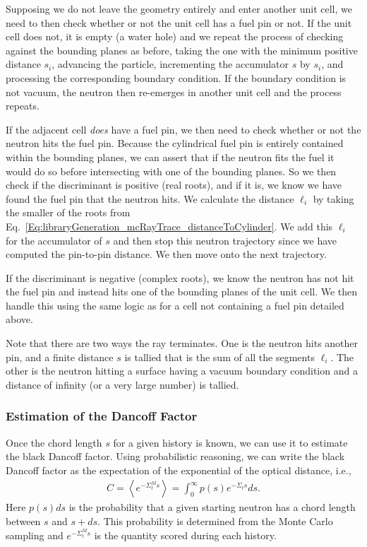 Supposing we do not leave the geometry entirely and enter another unit cell, we need to then check whether or not the unit cell has a fuel pin or not. If the unit cell does not, it is empty (a water hole) and we repeat the process of checking against the bounding planes as before, taking the one with the minimum positive distance $s_i$, advancing the particle, incrementing the accumulator $s$ by $s_i$, and processing the corresponding boundary condition. If the boundary condition is not vacuum, the neutron then re-emerges in another unit cell and the process repeats.

If the adjacent cell \emph{does} have a fuel pin, we then need to check whether or not the neutron hits the fuel pin. Because the cylindrical fuel pin is entirely contained within the bounding planes, we can assert that if the neutron fits the fuel it would do so before intersecting with one of the bounding planes. So we then check if the discriminant is positive (real roots), and if it is, we know we have found the fuel pin that the neutron hits. We calculate the distance $\ell_i$ by taking the smaller of the roots from Eq.~\eqref{Eq:libraryGeneration_mcRayTrace_distanceToCylinder}. We add this $\ell_i$ for the accumulator of $s$ and then stop this neutron trajectory since we have computed the pin-to-pin distance. We then move onto the next trajectory.

If the discriminant is negative (complex roots), we know the neutron has not hit the fuel pin and instead hits one of the bounding planes of the unit cell. We then handle this using the same logic as for a cell not containing a fuel pin detailed above.

Note that there are two ways the ray terminates. One is the neutron hits another pin, and a finite distance $s$ is tallied that is the sum of all the segments $\ell_i$. The other is the neutron hitting a surface having a vacuum boundary condition and a distance of infinity (or a very large number) is tallied.

\subsubsection{Estimation of the Dancoff Factor}

Once the chord length $s$ for a given history is known, we can use it to estimate the black Dancoff factor. Using probabilistic reasoning, we can write the black Dancoff factor as the expectation of the exponential of the optical distance, i.e.,
\begin{align}
  C = \left< e^{-\Sigma_t^M s} \right> = \int_0^\infty p(s) e^{-\Sigma_t s} ds .
\end{align}
Here $p(s)ds$ is the probability that a given starting neutron has a chord length between $s$ and $s + ds$. This probability is determined from the Monte Carlo sampling and $e^{-\Sigma_t^M s}$ is the quantity scored during each history.

